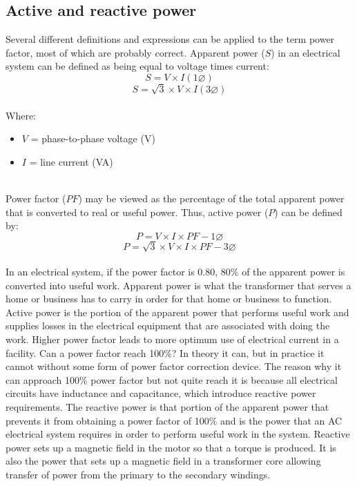 \documentclass[12pt,fleqn]{book} %
\begin{document}
\subsection{Active and reactive power}
Several different definitions and expressions can be applied to the term power factor, most of which are probably correct. Apparent power ($S$) in an electrical system can be defined as being equal to voltage times current:
\begin{equation}
    S=V\times I(1 \varnothing )
\end{equation}
\begin{equation}
    S=\sqrt{3}\times V\times I(3 \varnothing )
\end{equation}
\\ Where:
\begin{itemize}
    \item $V$ = phase-to-phase voltage (V)
    \item $I$ = line current (VA)
\end{itemize}
\\ Power factor ($PF$) may be viewed as the percentage of the total apparent power that is converted to real or useful power. Thus, active power ($P$) can be defined by:
\begin{equation}
    P=V\times I\times PF - 1 \varnothing
\end{equation}
\begin{equation}
    P=\sqrt{3}\times V\times I\times PF - 3 \varnothing
\end{equation}
\\ In an electrical system, if the power factor is 0.80, 80\% of the apparent power is converted into useful work. Apparent power is what the transformer that serves a home or business has to carry in order for that home or business to function. Active power is the portion of the apparent power that performs useful work and supplies losses in the electrical equipment that are associated with doing the work. Higher power factor leads to more optimum use of electrical current in a facility. Can a power factor reach 100\%? In theory it can, but in practice it cannot without some form of power factor correction device. The reason why it can approach 100\% power factor but not quite reach it is because all electrical circuits have inductance and capacitance, which introduce reactive power requirements. The reactive power is that portion of the apparent power that prevents it from obtaining a power factor of 100\% and is the power that an AC electrical system requires in order to perform useful work in the system. Reactive power sets up a magnetic field in the motor so that a torque is produced. It is also the power that sets up a magnetic field in a transformer core allowing transfer of power from the primary to the secondary windings.
\end{document}
